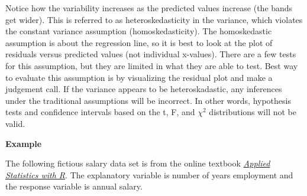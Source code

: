 \documentclass[
  letterpaper,
  DIV=11,
  numbers=noendperiod]{scrreprt}
\begin{document}
Notice how the variability increases as the predicted values increase
(the bands get wider). This is referred to as heteroskedasticity in the
variance, which violates the constant variance assumption
(homoskedasticity). The homoskedastic assumption is about the regression
line, so it is best to look at the plot of residuals versus predicted
values (not individual x-values). There are a few tests for this
assumption, but they are limited in what they are able to test. Best way
to evaluate this assumption is by visualizing the residual plot and make
a judgement call. If the variance appears to be heteroskadastic, any
inferences under the traditional assumptions will be incorrect. In other
words, hypothesis tests and confidence intervals based on the t, F, and
\(\chi^{2}\) distributions will not be valid.

\textbf{Example}

The following fictious salary data set is from the online textbook
\href{https://daviddalpiaz.github.io/appliedstats/index.html}{\emph{Applied
Statistics with R}}. The explanatory variable is number of years
employment and the response variable is annual salary.
\end{document}
